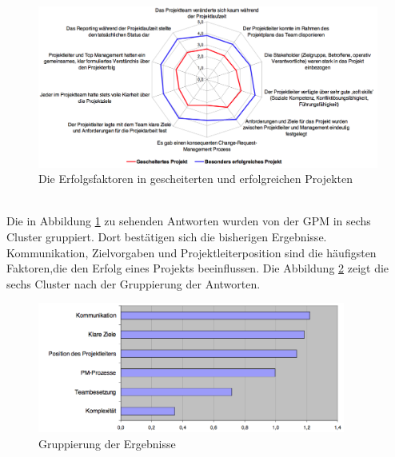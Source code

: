 \documentclass[11pt]{scrartcl}
\begin{document}
\begin{figure}[H]
	\begin{center}
		\includegraphics[width=1.1\textwidth]{img/ergebnis_erfolgsfaktoren}
		\caption{Die Erfolgsfaktoren in gescheiterten und erfolgreichen Projekten}
		\label{ergebnis_gpm_erfolgsfaktoren}	
	\end{center}
\end{figure}
\ \\
Die in Abbildung \ref{ergebnis_gpm_erfolgsfaktoren} zu sehenden Antworten wurden von der GPM in sechs Cluster gruppiert. Dort bestätigen sich die bisherigen Ergebnisse. Kommunikation, Zielvorgaben und Projektleiterposition sind die häufigsten Faktoren,die  den Erfolg eines Projekts beeinflussen. Die Abbildung \ref{ergebnis_gpm_gruppiert} zeigt die sechs Cluster nach der Gruppierung der Antworten. 

\begin{figure}[H]
	\begin{center}
		\includegraphics[width=0.9\textwidth]{img/ergebnis_gpm_gruppiert}
		\caption{Gruppierung der Ergebnisse}
		\label{ergebnis_gpm_gruppiert}	
	\end{center}
\end{figure}
\end{document}
